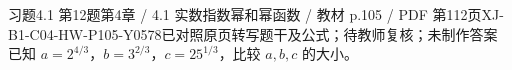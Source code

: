 \par\noindent\begin{minipage}{\linewidth}
\begin{bankitem}{习题4.1 第12题}{第4章 / 4.1 实数指数幂和幂函数 / 教材 p.105 / PDF 第112页}{XJ-B1-C04-HW-P105-Y0578}{已对照原页转写题干及公式；待教师复核；未制作答案}
已知 $a=2^{4/3}$，$b=3^{2/3}$，$c=25^{1/3}$，比较 $a,b,c$ 的大小。
\end{bankitem}
\end{minipage}\par\medskip

